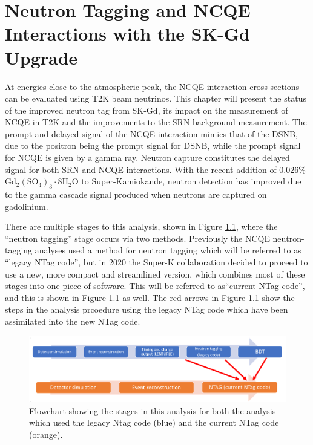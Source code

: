 \chapter{Neutron Tagging and NCQE
Interactions with the SK-Gd Upgrade}
\label{chp:ncqegd}


At energies close to the atmospheric peak, the NCQE interaction cross sections can be evaluated using T2K beam neutrinos. This chapter will present the status of the improved neutron tag from SK-Gd, its impact on the measurement of NCQE in T2K and the improvements to the SRN background measurement. The prompt and delayed signal of the NCQE interaction mimics that of the DSNB, due to the positron being the prompt signal for DSNB, while the prompt signal for NCQE is given by a gamma ray. Neutron capture constitutes the delayed signal for both SRN and NCQE interactions. With the recent addition of 0.026\% $\mathrm{Gd}_{2}\left(\mathrm{SO}_{4}\right)_{3} \cdot 8 \mathrm{H}_{2} \mathrm{O}$ to Super-Kamiokande, neutron detection has improved due to the  gamma cascade signal produced when neutrons are captured on gadolinium. 

There are multiple stages to this analysis, shown in Figure \ref{fig:analysis_flowchart}, where the ``neutron tagging'' stage occurs via two methods. Previously the NCQE neutron-tagging analyses used a method for neutron tagging which will be referred to as ``legacy NTag code'', but in 2020 the Super-K collaboration decided to proceed to use a new, more compact and streamlined version, which combines most of these stages into one piece of software. This will be referred to as``current NTag code'', and this is shown in Figure \ref{fig:analysis_flowchart} as well. The red arrows in Figure \ref{fig:analysis_flowchart} show the steps in the analysis prcoedure using the legacy NTag code which have been assimilated into the new NTag code.

\begin{figure}
    \includegraphics[width=\textwidth]{Figures/analysis_flowchart.png}
    \caption{Flowchart showing the stages in this analysis for both the analysis which used the legacy Ntag code (blue) and the current NTag code (orange).}
\label{fig:analysis_flowchart}
\end{figure}

